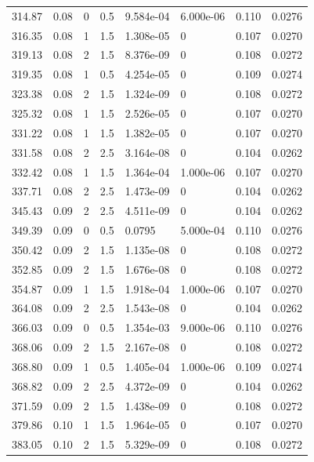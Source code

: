 \documentclass[preview]{standalone}
\begin{document}
{{\begin{tabular}{L{1.2cm}C{1.2cm} C{0.3cm}C{0.5cm} C{1.4cm}C{1.4cm} C{1.4cm}C{1.4cm}}
  314.87  &  0.08  & 0     & 0.5 &  9.584e-04  & 6.000e-06  & 0.110 &  0.0276   \\ 
  316.35  &  0.08  & 1     & 1.5 &  1.308e-05  & 0  & 0.107 &  0.0270   \\ 
  319.13  &  0.08  & 2     & 1.5 &  8.376e-09  & 0  & 0.108 &  0.0272   \\ 
  319.35  &  0.08  & 1     & 0.5 &  4.254e-05  & 0  & 0.109 &  0.0274   \\ 
  323.38  &  0.08  & 2     & 1.5 &  1.324e-09  & 0  & 0.108 &  0.0272   \\ 
  325.32  &  0.08  & 1     & 1.5 &  2.526e-05  & 0  & 0.107 &  0.0270   \\ 
  331.22  &  0.08  & 1     & 1.5 &  1.382e-05  & 0  & 0.107 &  0.0270   \\ 
  331.58  &  0.08  & 2     & 2.5 &  3.164e-08  & 0  & 0.104 &  0.0262   \\ 
  332.42  &  0.08  & 1     & 1.5 &  1.364e-04  & 1.000e-06  & 0.107 &  0.0270   \\ 
  337.71  &  0.08  & 2     & 2.5 &  1.473e-09  & 0  & 0.104 &  0.0262   \\ 
  345.43  &  0.09  & 2     & 2.5 &  4.511e-09  & 0  & 0.104 &  0.0262   \\ 
  349.39  &  0.09  & 0     & 0.5 &  0.0795  & 5.000e-04  & 0.110 &  0.0276   \\ 
  350.42  &  0.09  & 2     & 1.5 &  1.135e-08  & 0  & 0.108 &  0.0272   \\ 
  352.85  &  0.09  & 2     & 1.5 &  1.676e-08  & 0  & 0.108 &  0.0272   \\ 
  354.87  &  0.09  & 1     & 1.5 &  1.918e-04  & 1.000e-06  & 0.107 &  0.0270   \\ 
  364.08  &  0.09  & 2     & 2.5 &  1.543e-08  & 0  & 0.104 &  0.0262   \\ 
  366.03  &  0.09  & 0     & 0.5 &  1.354e-03  & 9.000e-06  & 0.110 &  0.0276   \\ 
  368.06  &  0.09  & 2     & 1.5 &  2.167e-08  & 0  & 0.108 &  0.0272   \\ 
  368.80  &  0.09  & 1     & 0.5 &  1.405e-04  & 1.000e-06  & 0.109 &  0.0274   \\ 
  368.82  &  0.09  & 2     & 2.5 &  4.372e-09  & 0  & 0.104 &  0.0262   \\ 
  371.59  &  0.09  & 2     & 1.5 &  1.438e-09  & 0  & 0.108 &  0.0272   \\ 
  379.86  &  0.10  & 1     & 1.5 &  1.964e-05  & 0  & 0.107 &  0.0270   \\ 
  383.05  &  0.10  & 2     & 1.5 &  5.329e-09  & 0  & 0.108 &  0.0272   \\ 

\end{tabular}}}
\end{document}
